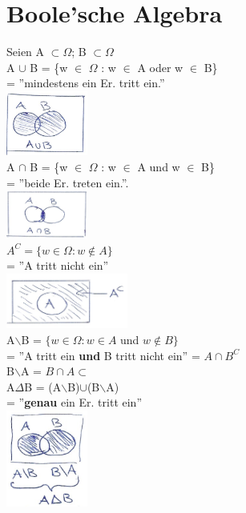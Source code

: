 \section{Boole'sche Algebra}
Seien A $\subset \Omega$; B $\subset \Omega$\\
A $\cup$ B = \{w $\in$ $\Omega$ : w $\in$ A oder w $\in$ B\}\\
= ''mindestens ein Er. tritt ein.''\\\includegraphics[width=0.2\textwidth]{img/ver.PNG}\medskip\\
A $\cap$ B = \{w $\in$ $\Omega$ : w $\in$ A und w $\in$ B\}\\
= ''beide Er. treten ein.''.\\\includegraphics[width=0.2\textwidth]{img/schnitt.PNG}\medskip\\
$A^C =\{ w \in \Omega : w \notin A\}$\\
= ''A tritt nicht ein''\\\includegraphics[width=0.3\textwidth]{img/komplement.PNG}\medskip\\
A$\backslash$B = $\{w \in \Omega : w \in A $ und $w \notin B\}$\\
= ''A tritt ein \textbf{und} B tritt nicht ein'' = $A\cap B^C$\medskip\\
B$\backslash$A = $B\cap A \subset$\\
A$\Delta$B = (A$\backslash$B)$\cup$(B$\backslash$A)\\
= ''\textbf{genau} ein Er. tritt ein''\\\includegraphics[width=0.2\textwidth]{img/genau1.PNG}\medskip\\
